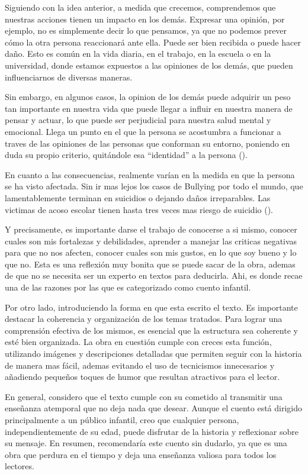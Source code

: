 \documentclass[letterpaper, 12pt]{report}
\begin{document}
Siguiendo con la idea anterior, a medida que crecemos,
comprendemos que nuestras acciones tienen un impacto en los
demás. Expresar una opinión, por ejemplo, no es simplemente
decir lo que pensamos, ya que no podemos prever cómo la
otra persona reaccionará ante ella. Puede ser bien recibida
o puede hacer daño. Esto es común en la vida diaria, en el
trabajo, en la escuela o en la universidad, donde estamos
expuestos a las opiniones de los demás, que pueden
influenciarnos de diversas maneras.

Sin embargo, en algunos casos, la opinion de los demás
puede adquirir un peso tan importante en nuestra vida que
puede llegar a influir en nuestra manera de pensar y
actuar, lo que puede ser perjudicial para nuestra salud
mental y emocional. Llega un punto en el que la persona se
acostumbra a funcionar a traves de las opiniones de las
personas que conforman su entorno, poniendo en duda su
propio criterio, quitándole esa ``identidad'' a la persona
(\cite{Psicología}).

En cuanto a las consecuencias, realmente varían en la
medida en que la persona se ha visto afectada. Sin ir mas
lejos los casos de Bullying por todo el mundo, que
lamentablemente terminan en suicidios o dejando daños
irreparables. Las victimas de acoso escolar tienen hasta
tres veces mas riesgo de suicidio (\cite{AcosoEscolar}).

Y precisamente, es importante darse el trabajo de conocerse
a si mismo, conocer cuales son mis fortalezas y
debilidades, aprender a manejar las criticas negativas para
que no nos afecten, conocer cuales son mis gustos, en lo
que soy bueno y lo que no. Esta es una reflexión muy bonita
que se puede sacar de la obra, ademas de que no se necesita
ser un experto en textos para deducirla. Ahi, es donde
recae una de las razones por las que es categorizado como
cuento infantil.

Por otro lado, introduciendo la forma en que esta escrito
el texto. Es importante destacar la coherencia y
organización de los temas tratados. Para lograr una
comprensión efectiva de los mismos, es esencial que la
estructura sea coherente y esté bien organizada. La obra en
cuestión cumple con creces esta función, utilizando
imágenes y descripciones detalladas que permiten seguir con
la historia de manera mas fácil, ademas evitando el uso de
tecnicismos innecesarios y añadiendo pequeños toques de
humor que resultan atractivos para el lector.

En general, considero que el texto cumple con su cometido
al transmitir una enseñanza atemporal que no deja nada que
desear. Aunque el cuento está dirigido principalmente a un
público infantil, creo que cualquier persona,
independientemente de su edad, puede disfrutar de la
historia y reflexionar sobre su mensaje. En resumen,
recomendaría este cuento sin dudarlo, ya que es una obra
que perdura en el tiempo y deja una enseñanza valiosa para
todos los lectores.

\newpage

\printbibliography
\end{document}
